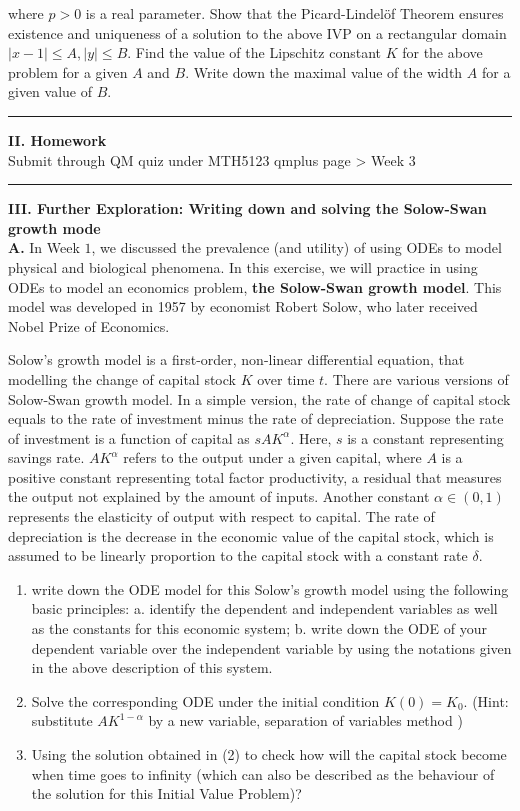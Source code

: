 \documentclass[11pt,a4paper,twoside]{article}
\begin{document}
	where $p > 0$ is a real parameter. Show that the Picard-Lindel\"{o}f Theorem ensures existence and uniqueness of a solution to the above IVP on a rectangular domain $|x−1| \leq A, |y| \leq B$. Find the value of the Lipschitz constant $K$ for the above problem for a given $A$ and $B$. Write down the maximal value of the width $A$ for a given value of $B$.\par
	\rule{\textwidth}{0.4pt}
	\textbf{II. Homework}\\
	Submit through QM quiz under MTH5123 qmplus page > Week 3\par
	\rule{\textwidth}{0.4pt}
	\textbf{III. Further Exploration: Writing down and solving the Solow-Swan growth mode}\\
	\textbf{A.} In Week $1$, we discussed the prevalence (and utility) of using ODEs to model physical and biological phenomena. In this exercise, we will practice in using ODEs to model an economics problem, \textbf{the Solow-Swan growth model}. This model was developed in 1957 by economist Robert Solow, who later received Nobel Prize of Economics.\par
	Solow’s growth model is a first-order, non-linear differential equation, that modelling the change of capital stock $K$ over time $t$. There are various versions of Solow-Swan growth model. In a simple version, the rate of change of capital stock equals to the rate of investment minus the rate of depreciation. Suppose the rate of investment is a function of capital as $sAK^\alpha$. Here, $s$ is a constant representing savings rate. $AK^\alpha$ refers to the output under a given capital, where $A$ is a positive constant representing total factor productivity, a residual that measures the output not explained by the amount of inputs. Another constant $\alpha \in (0, 1)$ represents the elasticity of output with respect to capital. The rate of depreciation is the decrease in the economic value of the capital stock, which is assumed to be linearly proportion to the capital stock with a constant rate $\delta$.
	\begin{enumerate}[(1)]
		\item write down the ODE model for this Solow’s growth model using the following basic principles: a. identify the dependent and independent variables as well as the constants for this economic system; b. write down the ODE of your dependent variable over the independent variable by using the notations given in the above description of this system.
		\item Solve the corresponding ODE under the initial condition $K(0) = K_0$. (Hint: substitute $AK^{1-\alpha}$ by a new variable, separation of variables method )
		\item Using the solution obtained in (2) to check how will the capital stock become when time goes to infinity (which can also be described as the behaviour of the solution for this Initial Value Problem)?
	\end{enumerate}
\end{document}
